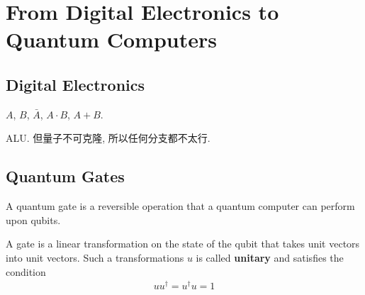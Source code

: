 \newpage
\section{From Digital Electronics to Quantum Computers}

\subsection{Digital Electronics}
$A$, $B$, $\bar{A}$, $A\cdot B$, $A+B$. 

ALU. 但量子不可克隆, 所以任何分支都不太行.

\subsection{Quantum Gates}
A quantum gate is a reversible operation that a quantum computer can perform upon qubits.
 
A gate is a linear transformation on the state of the qubit that takes unit vectors into unit vectors. Such a transformations $u$ is called \textbf{unitary} and satisfies the condition
\begin{align*}
    uu^\dagger=u^\dagger u=1
\end{align*}

